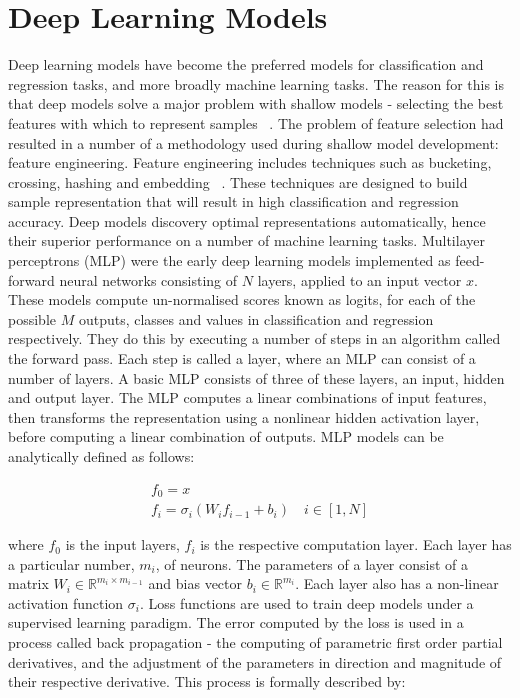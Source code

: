 \section{Deep Learning Models}

Deep learning models have become the preferred models for classification and regression tasks, and more broadly machine learning tasks. The reason for this is that deep models solve a major problem with shallow models - selecting the best features with which to represent samples ~\citep{Goodfellow-et-al-2016}. The problem of feature selection had resulted in a number of a methodology used during shallow model development: feature engineering. Feature engineering includes techniques such as bucketing, crossing, hashing and embedding ~\citep{murphy2012machine, Goodfellow-et-al-2016}. These techniques are designed to build sample representation that will result in high classification and regression accuracy. Deep models discovery optimal representations automatically, hence their superior performance on a number of machine learning tasks. \newline
Multilayer perceptrons (MLP) were the early deep learning models implemented as feed-forward neural networks consisting of $N$ layers, applied to an input vector $ x $. These models compute un-normalised scores known as logits, for each of the possible $ M $ outputs, classes and values in classification and regression respectively. They do this by executing a number of steps in an algorithm called the forward pass. Each step is called a layer, where an MLP can consist of a number of layers. A basic MLP consists of three of these layers, an input, hidden and output layer. The MLP computes a linear combinations of input features, then transforms the representation using a nonlinear hidden activation layer, before computing a linear combination of outputs. MLP models can be analytically defined as follows:

\begin{subequations}
\begin{gather}
	f_0 = x \\
	f_i=\sigma_i(W_if_{i - 1} + b_i) \quad i \in [1, N]
\end{gather}
\end{subequations}

where $f_0$ is the input layers, $f_i$ is the respective computation layer. Each layer has a particular number,  $m_i$, of neurons. The parameters of a layer consist of a matrix $W_i \in \mathbb{R}^{m_i \times m_{i-1}}$ and bias vector $b_i \in  \mathbb{R}^{m_i}$. Each layer also has a non-linear activation function $\sigma_i$. \newline
Loss functions are used to train deep models under a supervised learning paradigm. The error computed by the loss is used in a process called back propagation - the computing of parametric first order partial derivatives, and the adjustment of the parameters in direction and magnitude of their respective derivative. This process is formally described by:

